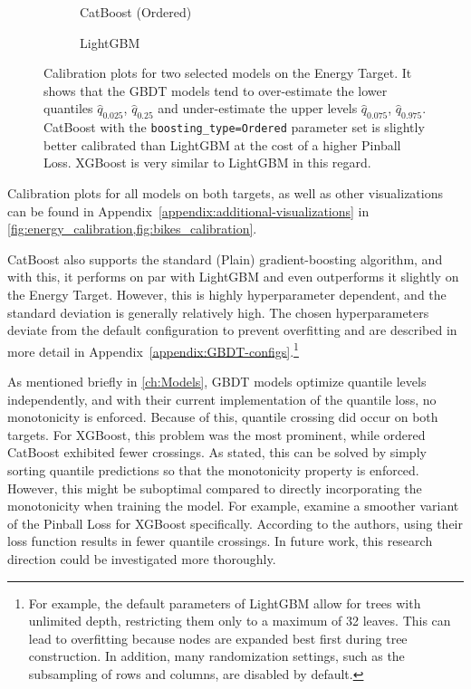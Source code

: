 \begin{figure}[htbp]
    \centering
    \begin{subfigure}[b]{0.5\textwidth}
        \centering
        
        \caption{CatBoost (Ordered)}
        \label{fig:catboost-ordered-calibration}
    \end{subfigure}%
    \begin{subfigure}[b]{0.5\textwidth}
        \centering
        
        \caption{LightGBM}
        \label{fig:lgbm-calibration}
    \end{subfigure}
    \caption{Calibration plots for two selected models on the Energy Target. It shows that the GBDT models tend to over-estimate the lower quantiles $\hat{q}_{0.025}$, $\hat{q}_{0.25}$ and under-estimate the upper levels $\hat{q}_{0.075}$, $\hat{q}_{0.975}$. CatBoost with the \texttt{boosting\_type=Ordered} parameter set is slightly better calibrated than LightGBM at the cost of a higher Pinball Loss. XGBoost is very similar to LightGBM in this regard.}
    \label{fig:calibration-comparison}
\end{figure}
Calibration plots for all models on both targets, as well as other visualizations can be found in Appendix~\ref{appendix:additional-visualizations} in \cref{fig:energy_calibration,fig:bikes_calibration}.

CatBoost also supports the standard (Plain) gradient-boosting algorithm,
and with this, it performs on par with LightGBM and even outperforms it slightly on
the Energy Target. However, this is highly hyperparameter dependent, and the standard
deviation is generally relatively high. The chosen hyperparameters deviate from the default 
configuration to prevent overfitting and are described in more detail in Appendix~\ref{appendix:GBDT-configs}.\footnote{For example, the default parameters of LightGBM allow for trees with unlimited depth, restricting them only to a maximum of 32 leaves. This can lead to overfitting because nodes are expanded best first during tree construction. In addition, many randomization settings, such as the subsampling of rows and columns, are disabled by default.}

As mentioned briefly in \cref{ch:Models}, GBDT models optimize quantile levels independently, and with their current implementation of the quantile loss, no monotonicity is enforced. Because of this, quantile crossing did occur on both targets. For XGBoost, this problem was the most prominent, while ordered CatBoost exhibited fewer crossings. As stated, this can be solved by simply sorting quantile predictions so that the monotonicity property is enforced. However, this might be suboptimal compared to directly incorporating the monotonicity when training the model. For example, \cite{sluijterman_composite_2024} examine a smoother variant of the Pinball Loss for XGBoost specifically. According to the authors, using their loss function results in fewer quantile crossings. In future work, this research direction could be investigated more thoroughly.

